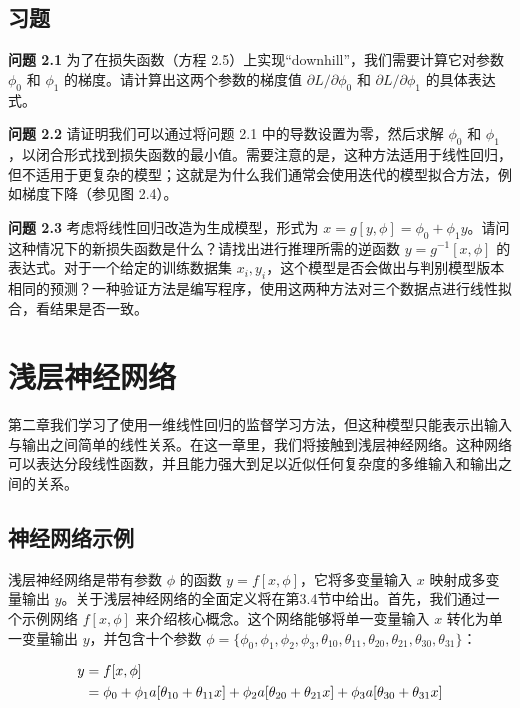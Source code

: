 \documentclass[lang=cn,newtx,10pt,scheme=chinese]{elegantbook}
\begin{document}
\section{习题}

\textbf{问题 2.1} 为了在损失函数（方程 2.5）上实现“downhill”，我们需要计算它对参数 $\phi_0$ 和 $\phi_1$ 的梯度。请计算出这两个参数的梯度值 $\partial L / \partial \phi_0$ 和 $\partial L / \partial \phi_1$ 的具体表达式。

\textbf{问题 2.2} 请证明我们可以通过将问题 2.1 中的导数设置为零，然后求解 $\phi_0$ 和 $\phi_1$，以闭合形式找到损失函数的最小值。需要注意的是，这种方法适用于线性回归，但不适用于更复杂的模型；这就是为什么我们通常会使用迭代的模型拟合方法，例如梯度下降（参见图 2.4）。

\textbf{问题 2.3} 考虑将线性回归改造为生成模型，形式为 $x = g[y, \phi] = \phi_0 + \phi_1 y$。请问这种情况下的新损失函数是什么？请找出进行推理所需的逆函数 $y = g^{-1}[x, \phi]$ 的表达式。对于一个给定的训练数据集 {${x_i,y_i}$}，这个模型是否会做出与判别模型版本相同的预测？一种验证方法是编写程序，使用这两种方法对三个数据点进行线性拟合，看结果是否一致。

\chapter{浅层神经网络}

第二章我们学习了使用一维线性回归的监督学习方法，但这种模型只能表示出输入与输出之间简单的线性关系。在这一章里，我们将接触到浅层神经网络。这种网络可以表达分段线性函数，并且能力强大到足以近似任何复杂度的多维输入和输出之间的关系。

\section{神经网络示例}

浅层神经网络是带有参数 \(\phi\) 的函数 \(y = f[x, \phi]\)，它将多变量输入 \(x\) 映射成多变量输出 \(y\)。关于浅层神经网络的全面定义将在第3.4节中给出。首先，我们通过一个示例网络 \(f[x, \phi]\) 来介绍核心概念。这个网络能够将单一变量输入 \(x\) 转化为单一变量输出 \(y\)，并包含十个参数 \(\phi = \{\phi_0, \phi_1, \phi_2, \phi_3, \theta_{10}, \theta_{11}, \theta_{20}, \theta_{21}, \theta_{30}, \theta_{31}\}\)：


\begin{align}
	y &= f[x, \phi] \notag \\ 
	&= \phi_0 + \phi_1a[\theta_{10} + \theta_{11}x] + \phi_2a[\theta_{20} + \theta_{21}x] + \phi_3a[\theta_{30} + \theta_{31}x] 
\end{align}
\end{document}
